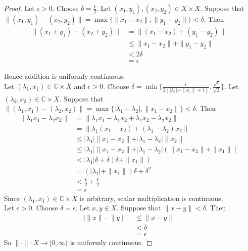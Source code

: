 \documentclass[12pt]{amsart}
\newcommand{\del}{\delta}
\newcommand{\lam}{\lambda}
\newcommand{\ep}{\epsilon}
\newcommand{\C}{\mathbb{C}}
\newcommand{\Rg}{[0,\infty)}
\begin{document}
	\begin{proof}
		Let $\ep > 0$. Choose $\del = \frac{\ep}{2}$. Let $(x_1,y_1), (x_2,y_2) \in X \times X$. Suppose that $\|(x_1,y_1)-(x_2,y_2) \| = \max\{\|x_1-x_2 \|, \|y_1 - y_2 \|\} < \del$. Then 
		\begin{align*}
			\|(x_1 + y_1) - (x_2+y_2) \|
			&= \|(x_1-x_2) + (y_1-y_2) \|\\
			& \leq \| x_1-x_2 \|+ \|y_1-y_2 \|\\
			& < 2\del \\
			&= \ep
		\end{align*} 
		
		Hence addition is uniformly continuous. \vspace{1cm}\\ Let $(\lam_1,x_1) \in \C \times X$ and $\ep >0$. Choose $\del = \min\{\frac{\ep}{2(\vert \lam_1 \vert + \|x_1 \|+ 1)}, \frac{\sqrt{\ep}}{\sqrt{2}}\}$. Let $(\lam_2, x_2) \in \C \times X$. Suppose that $\|(\lam_1, x_1)-(\lam_2,x_2) \| = \max\{\vert \lam_1-\lam_2 \vert , \|x_1 - x_2 \|\} < \del$. Then 
		\begin{align*}
			\|\lam_1x_1 - \lam_2x_2 \|
			&= \|\lam_1x_1 - \lam_1x_2 + \lam_1x_2- \lam_2x_2 \|\\
			&= \|\lam_1(x_1-x_2) + (\lam_1-\lam_2)x_2 \|\\
			& \leq \vert \lam_1 \vert \| x_1-x_2 \|+ \vert \lam_1-\lam_2 \vert \|x_2\|\\
			& \leq \vert \lam_1 \vert  \| x_1-x_2 \|+ \vert \lam_1-\lam_2 \vert (\|x_1 -x_2\|+ \|x_1\|)\\
			& < \vert \lam_1 \vert \del  +  \del( \del + \|x_1 \|)\\
			&= (\vert \lam_1 \vert + \|x_1 \|) \del + \del^2 \\
			&< \frac{\ep}{2}+ \frac{\ep}{2}\\
			&= \ep
		\end{align*}
		Since $(\lam_1, x_1) \in \C \times X$ is arbitrary, scalar multiplication is continuous. \vspace{1cm} \\ Let $\ep > 0$. Choose $\del = \ep$. Let $x,y \in X$. Suppose that $\|x-y \|< \del$. Then 
		\begin{align*}
			\big \vert \|x \|- \|y \|\big  \vert
			& \leq \|x - y \|\\
			&< \del\\
			&=\ep
		\end{align*}  
		So $\|\cdot \|: X \rightarrow \Rg$ is uniformly continuous.
	\end{proof}
	
\end{document}

